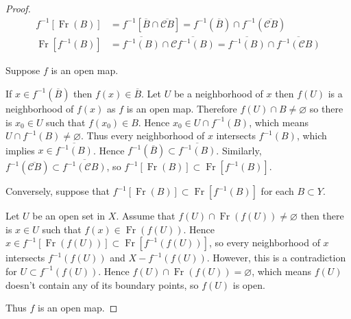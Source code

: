 \begin{proof}
	\begingroup
	\allowdisplaybreaks%
	\begin{align*}
		f^{-1}\left\lbrack \operatorname{Fr}(B) \right\rbrack & = f^{-1}\left\lbrack \overline{B} \cap \overline{\mathscr{C}B} \right\rbrack = f^{-1}(\overline{B}) \cap f^{-1}(\overline{\mathscr{C}B}) \\
		\operatorname{Fr}\left\lbrack f^{-1}(B) \right\rbrack & = \overline{f^{-1}(B)} \cap \overline{\mathscr{C}f^{-1}(B)} = \overline{f^{-1}(B)} \cap \overline{f^{-1}(\mathscr{C}B)}
	\end{align*}
	\endgroup

	Suppose \( f \) is an open map.

	If \( x \in f^{-1}(\overline{B}) \) then \( f(x) \in \overline{B} \). Let \( U \) be a neighborhood of \( x \) then \( f(U) \) is a neighborhood of \( f(x) \) as \( f \) is an open map. Therefore \( f(U) \cap B \ne \varnothing \) so there is \( x_{0} \in U \) such that \( f(x_{0}) \in B \). Hence \( x_{0} \in U \cap f^{-1}(B) \), which means \( U \cap f^{-1}(B) \ne \varnothing \). Thus every neighborhood of \( x \) intersects \( f^{-1}(B) \), which implies \( x \in \overline{f^{-1}(B)} \). Hence \( f^{-1}(\overline{B}) \subset \overline{f^{-1}(B)} \). Similarly, \( f^{-1}(\overline{\mathscr{C}B}) \subset \overline{f^{-1}(\mathscr{C}B)} \), so \( f^{-1}\left\lbrack \operatorname{Fr}(B) \right\rbrack \subset \operatorname{Fr}\left\lbrack f^{-1}(B) \right\rbrack \).

	\bigskip

	Conversely, suppose that \( f^{-1}\left\lbrack \operatorname{Fr}(B) \right\rbrack \subset \operatorname{Fr}\left\lbrack f^{-1}(B) \right\rbrack \) for each \( B \subset Y \).

	Let \( U \) be an open set in \( X \). Assume that \( f(U) \cap \operatorname{Fr}(f(U)) \ne \varnothing \) then there is \( x\in U \) such that \( f(x) \in \operatorname{Fr}(f(U)) \). Hence \( x \in f^{-1}\left\lbrack \operatorname{Fr}(f(U)) \right\rbrack \subset \operatorname{Fr}\left\lbrack f^{-1}(f(U)) \right\rbrack \), so every neighborhood of \( x \) intersects \( f^{-1}(f(U)) \) and \( X - f^{-1}(f(U)) \). However, this is a contradiction for \( U \subset f^{-1}(f(U)) \). Hence \( f(U) \cap \operatorname{Fr}(f(U)) = \varnothing \), which means \( f(U) \) doesn't contain any of its boundary points, so \( f(U) \) is open.

	Thus \( f \) is an open map.
\end{proof}

